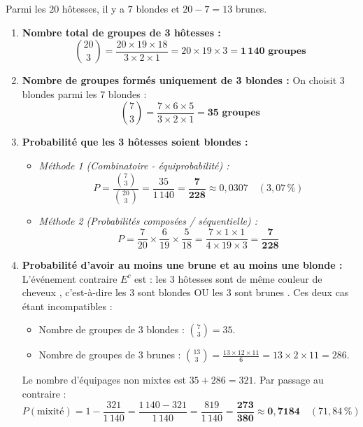 \documentclass[11pt,a4paper]{article}
\begin{document}
\begin{correctionbox}
Parmi les $20$ hôtesses, il y a $7$ blondes et $20 - 7 = 13$ brunes.
\begin{enumerate}[label=\arabic*.]
    \item \textbf{Nombre total de groupes de 3 hôtesses :}
    \[
    \binom{20}{3} = \frac{20 \times 19 \times 18}{3 \times 2 \times 1} = 20 \times 19 \times 3 = \mathbf{1\,140\text{ groupes}}
    \]

    \item \textbf{Nombre de groupes formés uniquement de 3 blondes :}
    On choisit 3 blondes parmi les 7 blondes :
    \[
    \binom{7}{3} = \frac{7 \times 6 \times 5}{3 \times 2 \times 1} = \mathbf{35\text{ groupes}}
    \]

    \item \textbf{Probabilité que les 3 hôtesses soient blondes :}
    \begin{itemize}[label=$\bullet$]
        \item \emph{Méthode 1 (Combinatoire - équiprobabilité) :}
        \[
        P = \frac{\binom{7}{3}}{\binom{20}{3}} = \frac{35}{1\,140} = \mathbf{\frac{7}{228}} \approx 0{,}0307 \quad (3{,}07\,\%)
        \]
        \item \emph{Méthode 2 (Probabilités composées / séquentielle) :}
        \[
        P = \frac{7}{20} \times \frac{6}{19} \times \frac{5}{18} = \frac{7 \times 1 \times 1}{4 \times 19 \times 3} = \mathbf{\frac{7}{228}}
        \]
    \end{itemize}

    \item \textbf{Probabilité d'avoir au moins une brune et au moins une blonde :}
    L'événement contraire $E^c$ est : \og les 3 hôtesses sont de même couleur de cheveux \fg{}, c'est-à-dire \og les 3 sont blondes \fg{} OU \og les 3 sont brunes \fg{}.
    Ces deux cas étant incompatibles :
    \begin{itemize}[label=$\bullet$]
        \item Nombre de groupes de 3 blondes : $\binom{7}{3} = 35$.
        \item Nombre de groupes de 3 brunes : $\binom{13}{3} = \frac{13 \times 12 \times 11}{6} = 13 \times 2 \times 11 = 286$.
    \end{itemize}
    Le nombre d'équipages non mixtes est $35 + 286 = 321$. Par passage au contraire :
    \[
    P(\text{mixité}) = 1 - \frac{321}{1\,140} = \frac{1\,140 - 321}{1\,140} = \frac{819}{1\,140} = \mathbf{\frac{273}{380}} \approx \mathbf{0{,}7184} \quad (71{,}84\,\%)
    \]
\end{enumerate}
\end{correctionbox}
\end{document}
